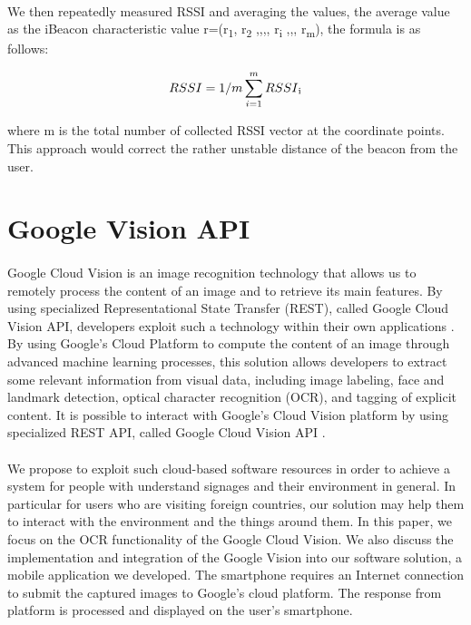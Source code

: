 \documentclass[12pt]{article}
\begin{document}
\paragraph{}We then repeatedly measured RSSI and averaging the values, the average value as the iBeacon characteristic value r=(r\textsubscript{1}, r\textsubscript{2} ,,,, r\textsubscript{i} ,,, r\textsubscript{m}), the formula is as follows:

\begin{equation}
RSSI = 1/m \sum_{i=1}^m RSSI \textsubscript{i}
\end{equation}

where m is the total number of collected RSSI vector at the coordinate points. This approach would correct the rather unstable distance of the beacon from the user. 

\section{Google Vision API}
\label{vision}
\paragraph{}Google Cloud Vision is an image recognition technology that allows us to remotely process the content of an image and to retrieve its main features. By using specialized  Representational State Transfer (REST), called Google Cloud Vision API, developers exploit such a technology within their own applications \cite{vision}. By using Google’s Cloud Platform to compute the content of an image through advanced machine learning processes, this solution allows developers to extract some relevant information from visual data, including image labeling, face and landmark detection, optical character recognition (OCR), and tagging of explicit content. It is possible to interact with Google’s Cloud Vision platform by using specialized REST API, called Google Cloud Vision API \cite{vision}.

\paragraph{}We propose to exploit such cloud-based software resources in order to achieve a system for people with understand signages and their environment in general. In particular for users who are visiting foreign countries, our solution may help them to interact with the environment and the things around them. In this paper, we focus on the OCR functionality of the Google Cloud Vision. We also discuss the implementation and integration of the Google Vision into our software solution, a mobile application we developed. The smartphone requires an Internet connection to submit the captured images to Google’s cloud platform. The response from platform is processed and displayed on the user's smartphone.
\end{document}
